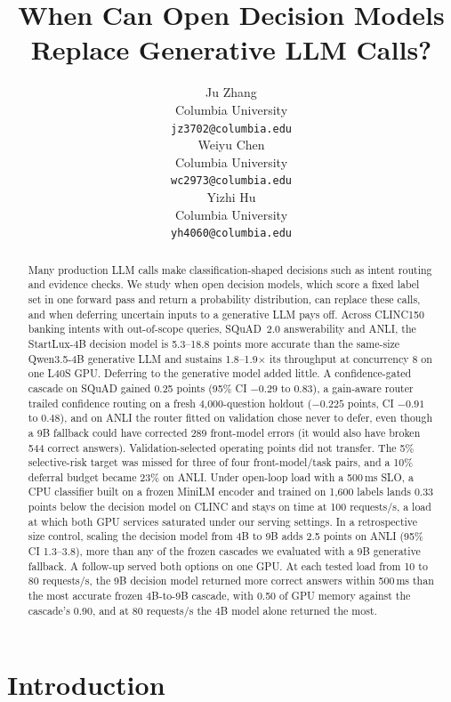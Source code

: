 \documentclass[11pt]{article}
\title{When Can Open Decision Models Replace Generative LLM Calls?}
\author{Ju Zhang \\
  Columbia University \\
  \texttt{jz3702@columbia.edu} \\\And
  Weiyu Chen \\
  Columbia University \\
  \texttt{wc2973@columbia.edu} \\\And
  Yizhi Hu \\
  Columbia University \\
  \texttt{yh4060@columbia.edu}}
\begin{document}
\maketitle

\begin{abstract}
Many production LLM calls make classification-shaped decisions such as intent routing and evidence checks. We study when open decision models, which score a fixed label set in one forward pass and return a probability distribution, can replace these calls, and when deferring uncertain inputs to a generative LLM pays off. Across CLINC150 banking intents with out-of-scope queries, SQuAD~2.0 answerability and ANLI, the StartLux-4B decision model is 5.3--18.8 points more accurate than the same-size Qwen3.5-4B generative LLM and sustains 1.8--1.9$\times$ its throughput at concurrency 8 on one L40S GPU. Deferring to the generative model added little. A confidence-gated cascade on SQuAD gained 0.25 points (95\% CI $-0.29$ to $0.83$), a gain-aware router trailed confidence routing on a fresh 4,000-question holdout ($-0.225$ points, CI $-0.91$ to $0.48$), and on ANLI the router fitted on validation chose never to defer, even though a 9B fallback could have corrected 289 front-model errors (it would also have broken 544 correct answers). Validation-selected operating points did not transfer. The 5\% selective-risk target was missed for three of four front-model/task pairs, and a 10\% deferral budget became 23\% on ANLI. Under open-loop load with a 500\,ms SLO, a CPU classifier built on a frozen MiniLM encoder and trained on 1,600 labels lands 0.33 points below the decision model on CLINC and stays on time at 100 requests/s, a load at which both GPU services saturated under our serving settings. In a retrospective size control, scaling the decision model from 4B to 9B adds 2.5 points on ANLI (95\% CI 1.3--3.8), more than any of the frozen cascades we evaluated with a 9B generative fallback. A follow-up served both options on one GPU. At each tested load from 10 to 80 requests/s, the 9B decision model returned more correct answers within 500\,ms than the most accurate frozen 4B-to-9B cascade, with 0.50 of GPU memory against the cascade's 0.90, and at 80 requests/s the 4B model alone returned the most.
\end{abstract}

\section{Introduction}
\end{document}
